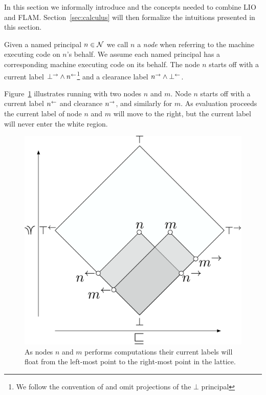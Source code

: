 In this section we informally introduce \lang{} and the concepts needed to combine LIO and FLAM. Section~\ref{sec:calculus} will then formalize the intuitions presented in this section.

Given a named principal $n \in \mathcal{N}$ we call $n$ a \emph{node} when referring to the machine executing code on $n$'s behalf. We assume each named principal has a corresponding machine executing code on its behalf. The node $n$ starts off with a current label $\bot^{\rightarrow} \wedge n^{\leftarrow}$\footnote{We follow the convention of \cite{Arden:2015:FA:2859845.2859998} and omit projections of the $\bot$ principal} and a clearance label $n^{\rightarrow} \wedge \bot^{\leftarrow}$.

Figure~\ref{fig:node-info-flow} illustrates running \lang{} with two nodes $n$ and $m$. Node $n$ starts off with a current label $n^{\leftarrow}$ and clearance $n^{\rightarrow}$, and similarly for $m$. As evaluation proceeds the current label of node $n$ and $m$ will move to the right, but the current label will never enter the white region.

\begin{figure}
    \centering
    \includegraphics[scale=0.25]{Illustrations/multi-node.pdf}
    \caption{As nodes $n$ and $m$ performs computations their current labels will float from the left-most point to the right-most point in the lattice.}
    \label{fig:node-info-flow}
\end{figure}

